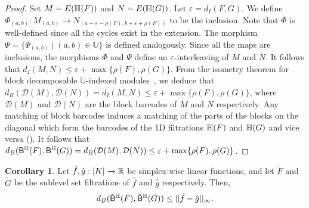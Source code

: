 \documentclass[10pt,a4paper]{amsart}
\newcommand {\mm}[1] {\ifmmode{#1}\else{\mbox{\(#1\)}}\fi}
\newcommand{\Rspace}        {\mm{\mathbb{R}}}
\newcommand{\har}           {\mm{\mathbb{H}}}
\newcommand{\eps}        {\varepsilon}
\theoremstyle{definition}
\newcommand{\hbarc}{\mathsf{B}^\har}
\newcommand{\obarc}{\breve{\mathsf{B}}^\har}
\newtheorem{corollary}[theorem]{Corollary}
\theoremstyle{remark}
\begin{document}
\begin{proof}
    
    Set $M=E(\har(F))$ and $N=E(\har(G))$.  Let $\eps = d_{I}(F,G)$. We define $\Phi_{(a,b)}: M_{(a,b)} \xrightarrow{} N_{(a-\eps-\rho(F), b+\eps+\rho(F))}$ to be the inclusion. Note that $\Phi$ is well-defined since all the cycles exist in the extension. %
    The morphism $\Psi = \{ \Psi_{(a,b)}\mid (a,b)\in \mathbb{U} \}$ is defined analogously. Since all the maps are inclusions, the morphisms $\Phi$ and $\Psi$ define an $\eps$-interleaving of $M$ and $N$. It follows that $d_I (M,N) \leq \eps+\max \{\rho(F), \rho(G) \}$.
    From the isometry theorem for block decomposable $\mathbb{U}$-indexed modules~\cite{bjerkevik2021stability,botnan2018algebraic}, we deduce that $d_B( {\mathcal{D}} (M), {\mathcal{D}} (N)) = d_I(M,N) \leq \eps +\max \{\rho(F), \rho(G) \}$, where ${\mathcal{D}}(M)$ and ${\mathcal{D}}(N)$ are the block barcodes of $M$ and $N$ respectively. Any matching of block barcodes induces a matching of the parts of the blocks on the diagonal which form the barcodes of the 1D filtrations $\har(F)$ and $\har(G)$ and vice versa (\cite[Proposition 4.2]{botnan2018algebraic}). It follows that $d_B (\hbarc(F), \hbarc(G)) = d_B( {\mathcal{D}} (M), {\mathcal{D}} (N))  \leq \eps + \max \{\rho(F), \rho(G)\}$. 
\end{proof}



\begin{corollary}
Let $\hat{f}, \hat{g} : |K| \xrightarrow{} \Rspace$ be simplex-wise linear functions, and let $\tilde{F}$ and $\tilde{G}$ be the sublevel set filtrations of $\hat{f}$ and $\hat{g}$ respectively. Then, $$d_{B}({\obarc(\tilde{F})}, {\obarc(\tilde{G}})) \leq || \hat{f}-\hat{g}||_{\infty}.$$
\end{corollary}
\end{document}
